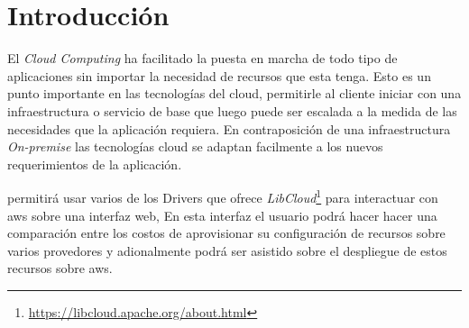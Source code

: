 
\chapter{Introducción} %

\label{ch:introduccion} %


El \textit{Cloud Computing} ha facilitado la puesta en marcha de todo tipo de aplicaciones sin importar la necesidad de recursos que esta tenga. Esto es un punto importante en las tecnologías del cloud, permitirle al cliente iniciar con una  infraestructura o servicio de base que luego puede ser escalada a la medida de las necesidades que la aplicación requiera. En contraposición de una infraestructura \textit{On-premise} las tecnologías cloud se adaptan facilmente a los nuevos requerimientos de la aplicación.\bigskip

\appName permitirá usar varios de los Drivers que ofrece \textit{LibCloud}\footnote{\url{https://libcloud.apache.org/about.html}} para interactuar con \acs{aws} sobre una interfaz web, En esta interfaz el usuario podrá hacer hacer una comparación entre los costos de aprovisionar su configuración de recursos sobre varios provedores y adionalmente podrá ser asistido sobre el despliegue de estos recursos sobre \acs{aws}.\bigskip






